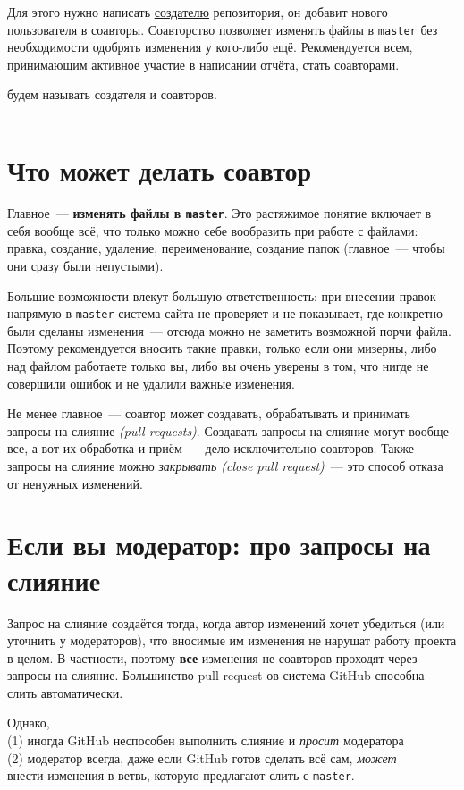 \documentclass[12pt,a4paper,report]{ncc}
\begin{document}
\ni Для этого нужно написать \underline{создателю} репозитория, он добавит нового пользователя в соавторы. Соавторство позволяет изменять файлы в {\tt master} без необходимости одобрять изменения у кого-либо ещё. Рекомендуется всем, принимающим активное участие в написании отчёта, стать соавторами.

 будем называть создателя и соавторов.

\vfill\eject
$\phantom{.}$ \vspace{-0.3cm}

\section{Что может делать соавтор}

\ni Главное~— {\bfseries изменять файлы в {\tt master}}. Это растяжимое понятие включает в себя вообще всё, что только можно себе вообразить при работе с файлами: правка, создание, удаление, переименование, создание папок (главное~— чтобы они сразу были непустыми).

\ms Большие возможности влекут большую ответственность: при внесении правок напрямую в {\tt master} система сайта не проверяет и не показывает, где конкретно были сделаны изменения~— отсюда можно не заметить возможной порчи файла. Поэтому рекомендуется вносить такие правки, только если они мизерны, либо над файлом работаете только вы, либо вы очень уверены в том, что нигде не совершили ошибок и не удалили важные изменения.

\ms Не менее главное~— соавтор может создавать, обрабатывать и принимать запросы на слияние {\it (pull requests)}. Создавать запросы на слияние могут вообще все, а вот их обработка и приём~— дело исключительно соавторов. Также запросы на слияние можно {\it закрывать (close pull request)}~— это способ отказа от ненужных изменений.

\section{Если вы модератор: про запросы на слияние}

\ni Запрос на слияние создаётся тогда, когда автор изменений хочет убедиться (или уточнить у модераторов), что вносимые им изменения не нарушат работу проекта в целом. В частности, поэтому {\bf все} изменения не-соавторов проходят через запросы на слияние. Большинство pull request-ов система GitHub способна слить автоматически.

\ms Однако, \\
\rlap{$\phantom{.}$}\hspace{0.5in} (1) \label{var1} иногда GitHub неспособен выполнить слияние и {\it просит} модератора \\
\rlap{$\phantom{.}$}\hspace{0.5in} (2) \label{var2} модератор всегда, даже если GitHub готов сделать всё сам, {\it может} \\
внести изменения в ветвь, которую предлагают слить с {\tt master}.
\end{document}
